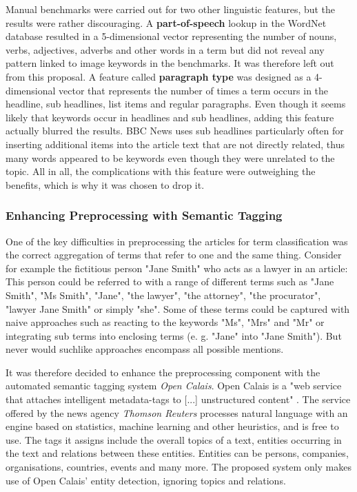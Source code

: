 \documentclass[11pt,a4paper,twoside]{article}
\begin{document}
Manual benchmarks were carried out for two other linguistic features, but the results were rather discouraging. A \textbf{part-of-speech} lookup in the WordNet database \cite{Fellbaum1998WordNet:Database} resulted in a 5-dimensional vector representing the number of nouns, verbs, adjectives, adverbs and other words in a term but did not reveal any pattern linked to image keywords in the benchmarks. It was therefore left out from this proposal. A feature called \textbf{paragraph type} was designed as a 4-dimensional vector that represents the number of times a term occurs in the headline, sub headlines, list items and regular paragraphs. Even though it seems likely that keywords occur in headlines and sub headlines, adding this feature actually blurred the results. BBC News uses sub headlines particularly often for inserting additional items into the article text that are not directly related, thus many words appeared to be keywords even though they were unrelated to the topic. All in all, the complications with this feature were outweighing the benefits, which is why it was chosen to drop it.

\subsubsection{Enhancing Preprocessing with Semantic Tagging} \label{SystemPreprocessCalais}

One of the key difficulties in preprocessing the articles for term classification was the correct aggregation of terms that refer to one and the same thing. Consider for example the fictitious person "Jane Smith" who acts as a lawyer in an article: This person could be referred to with a range of different terms such as "Jane Smith", "Ms Smith", "Jane", "the lawyer", "the attorney", "the procurator", "lawyer Jane Smith" or simply "she". Some of these terms could be captured with naive approaches such as reacting to the keywords "Ms", "Mrs" and "Mr" or integrating sub terms into enclosing terms (e. g. "Jane" into "Jane Smith"). But never would suchlike approaches encompass all possible mentions.

It was therefore decided to enhance the preprocessing component with the automated semantic tagging system \emph{Open Calais}. Open Calais is a "web service that attaches intelligent metadata-tags to [...] unstructured content" \cite[p. 1]{ThomsonReuters2018ThomsonGuide}. The service offered by the news agency \emph{Thomson Reuters} processes natural language with an engine based on statistics, machine learning and other heuristics, and is free to use. The tags it assigns include the overall topics of a text, entities occurring in the text and relations between these entities. Entities can be persons, companies, organisations, countries, events and many more. The proposed system only makes use of Open Calais' entity detection, ignoring topics and relations.
\end{document}
